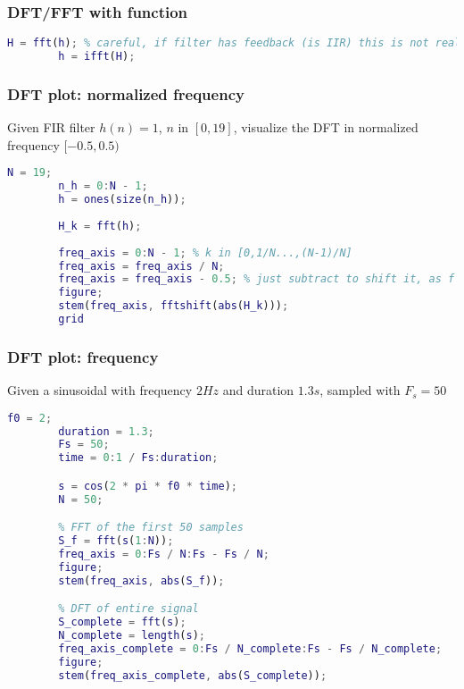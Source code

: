     \subsubsection{DFT/FFT with function}
    \begin{lstlisting}[language=Matlab, escapeinside=`']
        H = fft(h); % careful, if filter has feedback (is IIR) this is not really DFT, we are computing a truncated version
        h = ifft(H); 
    \end{lstlisting}

    \subsubsection{DFT plot: normalized frequency}
    Given FIR filter $h(n)=1$, $n$ in $[0,19]$, visualize the DFT in normalized frequency $[-0.5,0.5)$
    \begin{lstlisting}[language=Matlab, escapeinside=`']
        N = 19;
        n_h = 0:N - 1;
        h = ones(size(n_h));
        
        H_k = fft(h);
        
        freq_axis = 0:N - 1; % k in [0,1/N...,(N-1)/N]
        freq_axis = freq_axis / N;
        freq_axis = freq_axis - 0.5; % just subtract to shift it, as f normalliy in [0, 1)
        figure;
        stem(freq_axis, fftshift(abs(H_k)));
        grid
    \end{lstlisting}

    \subsubsection{DFT plot: frequency}
    Given a sinusoidal with frequency $2Hz$ and duration $1.3s$, sampled with $F_s=50$
    \begin{lstlisting}[language=Matlab, escapeinside=`']
        f0 = 2;
        duration = 1.3;
        Fs = 50;
        time = 0:1 / Fs:duration;

        s = cos(2 * pi * f0 * time);
        N = 50;

        % FFT of the first 50 samples
        S_f = fft(s(1:N));
        freq_axis = 0:Fs / N:Fs - Fs / N;
        figure;
        stem(freq_axis, abs(S_f));

        % DFT of entire signal
        S_complete = fft(s);
        N_complete = length(s);
        freq_axis_complete = 0:Fs / N_complete:Fs - Fs / N_complete;
        figure;
        stem(freq_axis_complete, abs(S_complete));
    \end{lstlisting}

